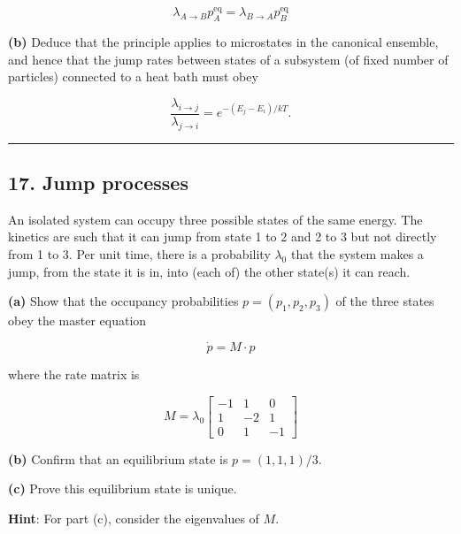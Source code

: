 \documentclass[
  letterpaper,
  enabledeprecatedfontcommands]{report}
\begin{document}
\[
\lambda_{A \to B} p^{\text{eq}}_A = \lambda_{B \to A} p^{\text{eq}}_B
\]

\textbf{(b)} Deduce that the principle applies to microstates in the
canonical ensemble, and hence that the jump rates between states of a
subsystem (of fixed number of particles) connected to a heat bath must
obey

\[
\frac{\lambda_{i \to j}}{\lambda_{j \to i}} = e^{-(E_j - E_i)/kT}.
\]

\begin{center}\rule{0.5\linewidth}{0.5pt}\end{center}

\subsection*{17. Jump processes}\label{jump-processes}

An isolated system can occupy three possible states of the same energy.
The kinetics are such that it can jump from state 1 to 2 and 2 to 3 but
not directly from 1 to 3. Per unit time, there is a probability
\(\lambda_0\) that the system makes a jump, from the state it is in,
into (each of) the other state(s) it can reach.

\textbf{(a)} Show that the occupancy probabilities
\(p = (p_1, p_2, p_3)\) of the three states obey the master equation

\[
\dot{p} = M \cdot p
\]

where the rate matrix is

\[
M = \lambda_0 \begin{bmatrix}
-1 & 1 & 0 \\
1 & -2 & 1 \\
0 & 1 & -1
\end{bmatrix}
\]

\textbf{(b)} Confirm that an equilibrium state is \(p = (1, 1, 1)/3\).

\textbf{(c)} Prove this equilibrium state is unique.

\textbf{Hint}: For part (c), consider the eigenvalues of \(M\).
\end{document}
